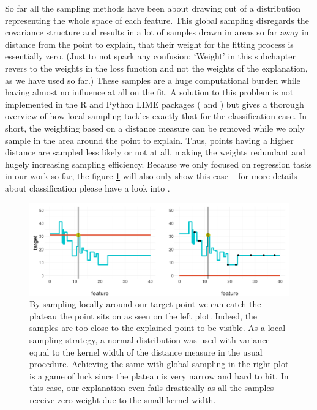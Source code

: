 \documentclass[
]{krantz}
\begin{document}
So far all the sampling methods have been about drawing out of a distribution representing the whole space of each feature.
This global sampling disregards the covariance structure and results in a lot of samples drawn in areas so far away in distance from the point to explain, that their weight for the fitting process is essentially zero.
(Just to not spark any confusion: `Weight' in this subchapter revers to the weights in the loss function and not the weights of the explanation, as we have used so far.)
These samples are a huge computational burden while having almost no influence at all on the fit.
A solution to this problem is not implemented in the R and Python LIME packages (\citet{thomasp85lime} and \citet{marcotcrlime}) but \citet{laugel2018defining} gives a thorough overview of how local sampling tackles exactly that for the classification case.
In short, the weighting based on a distance measure can be removed while we only sample in the area around the point to explain.
Thus, points having a higher distance are sampled less likely or not at all, making the weights redundant and hugely increasing sampling efficiency.
Because we only focused on regression tasks in our work so far, the figure \ref{fig:figlocalsampling} will also only show this case -- for more details about classification please have a look into \citet{laugel2018defining}.

\begin{figure}

{\centering \includegraphics[width=19.44in]{images/boston_betterVSlime_slim} 

}

\caption{By sampling locally around our target point we can catch the plateau the point sits on as seen on the left plot. Indeed, the samples are too close to the explained point to be visible. As a local sampling strategy, a normal distribution was used with variance equal to the kernel width of the distance measure in the usual procedure. Achieving the same with global sampling in the right plot is a game of luck since the plateau is very narrow and hard to hit. In this case, our explanation even fails drastically as all the samples receive zero weight due to the small kernel width.}\label{fig:figlocalsampling}
\end{figure}
\end{document}
